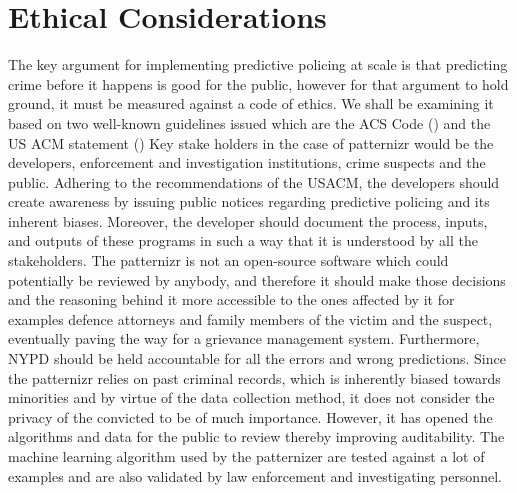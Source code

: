 \documentclass[a4paper,14pt]{extarticle}
\begin{document}
\section*{Ethical Considerations}
\begin{justifying}
The key argument for implementing predictive policing at scale is that predicting crime before it happens is good for the public, however for that argument to hold ground, it must be measured against a code of ethics. We shall be examining it based on two well-known guidelines issued which are the ACS Code (\cite{ACSCode}) and the US ACM statement (\cite{USACM})	\vspace{1em}
\newline Key stake holders in the case of patternizr would be the developers, enforcement and investigation institutions, crime suspects and the public. Adhering to the recommendations of the USACM, the developers should create awareness by issuing public notices regarding predictive policing and its inherent biases. Moreover, the developer should document the process, inputs, and outputs of these programs in such a way that it is understood by all the stakeholders.\vspace{1em}
\newline The patternizr is not an open-source software which could potentially be reviewed by anybody, and therefore it should make those decisions and the reasoning behind it more accessible to the ones affected by it for examples defence attorneys and family members of the victim and the suspect, eventually paving the way for a grievance management system. Furthermore, NYPD should be held accountable for all the errors and wrong predictions.\vspace{1em}
\newline Since the patternizr relies on past criminal records, which is inherently biased towards minorities and by virtue of the data collection method, it does not consider the privacy of the convicted to be of much importance. However, it has opened the algorithms and data for the public to review thereby improving auditability. The machine learning algorithm used by the patternizer are tested against a lot of examples and are also validated by law enforcement and investigating personnel.
\end{justifying}
\pagebreak
\end{document}
